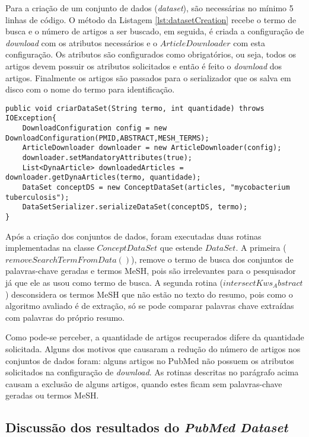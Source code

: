 Para a criação de um conjunto de dados (\emph{dataset}), são necessárias no mínimo 5 linhas de código. O método da Listagem \ref{lst:datasetCreation} recebe o termo de busca e o número de artigos a ser buscado, em seguida, é criada a configuração de \emph{download} com os atributos necessários e o $ArticleDownloader$ com esta configuração. Os atributos são configurados como obrigatórios, ou seja, todos os artigos devem possuir os atributos solicitados e então é feito o \emph{download} dos artigos. Finalmente os artigos são passados para o serializador que os salva em disco com o nome do termo para identificação.

\begin{lstlisting}
public void criarDataSet(String termo, int quantidade) throws IOException{
    DownloadConfiguration config = new DownloadConfiguration(PMID,ABSTRACT,MESH_TERMS);
    ArticleDownloader downloader = new ArticleDownloader(config);
    downloader.setMandatoryAttributes(true);
    List<DynaArticle> downloadedArticles = downloader.getDynaArticles(termo, quantidade);
    DataSet conceptDS = new ConceptDataSet(articles, "mycobacterium tuberculosis");
    DataSetSerializer.serializeDataSet(conceptDS, termo);
}
\end{lstlisting}

Após a criação dos conjuntos de dados, foram executadas duas rotinas implementadas na classe $ConceptDataSet$ que estende $DataSet$. A primeira ($removeSearchTermFromData()$), remove o termo de busca dos conjuntos de palavras-chave geradas e termos MeSH, pois são irrelevantes para o pesquisador já que ele as usou como termo de busca. A segunda rotina ($intersectKws_Abstract$) desconsidera os termos MeSH que não estão no texto do resumo, pois como o algoritmo avaliado é de extração, só se pode comparar palavras chave extraídas com palavras do próprio resumo.

Como pode-se perceber, a quantidade de artigos recuperados difere da quantidade solicitada. Alguns dos motivos que causaram a redução do número de artigos nos conjuntos de dados foram: alguns artigos no PubMed não possuem os atributos solicitados na configuração de \emph{download}. As rotinas descritas no parágrafo acima causam a exclusão de alguns artigos, quando estes ficam sem palavras-chave geradas ou termos MeSH.

\subsection{Discussão dos resultados do \emph{PubMed Dataset}}

